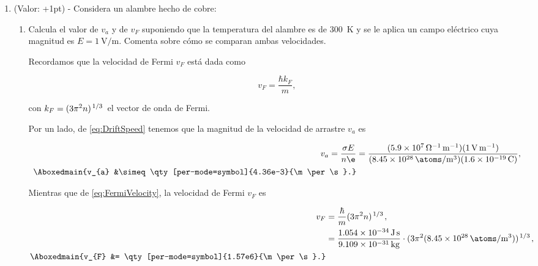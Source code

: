 \documentclass[./../main.tex]{subfiles}
\begin{document}
\begin{exercise}
\begin{enumerate}
            \color{blue}
            \item (Valor: +1pt) - Considera un alambre hecho de cobre:
                \begin{enumerate}[label = (b.\arabic*)]
                    \item Calcula el valor de \(v_{a}\) y de \(v_{F}\) suponiendo que la temperatura del alambre es de \qty{300}{\kelvin} y se le aplica un campo eléctrico cuya magnitud es \(E = \qty{1}{\V\per\m}\). Comenta sobre cómo se comparan ambas velocidades.
                    
                    \color{black}
                    \begin{solution}
                        Recordamos que la velocidad de Fermi \(v_{F}\) está dada como

                        \begin{equation}
                            v_{F} = \dfrac{\hbar k_{F}}{m},
                            \label{eq:FermiVelocity}
                        \end{equation}

                        con \(k_{F} = (3\pi^{2}n)^{\slashfrac{1}{3}}\) el vector de onda de Fermi.

                        Por un lado, de \cref{eq:DriftSpeed} tenemos que la magnitud de la velocidad de arrastre \(v_{a}\) es

                        \begin{align*}
                            v_{a} = \dfrac{\sigma E}{n\e} &= \dfrac{(\qty[per-mode=power]{5.9e7}{\per\ohm\per\m})(\qty{1}{\V\per\m})}{(\qty[per-mode=symbol]{8.45e28}{\atoms\per\m\cubed})(\qty{1.6e-19}{\C})},\\
                            \Aboxedmain{v_{a} &\simeq \qty[per-mode=symbol]{4.36e-3}{\m\per\s}.}
                        \end{align*}

                        Mientras que de \cref{eq:FermiVelocity}, la velocidad de Fermi \(v_{F}\) es

                        \begin{align}
                            v_{F} &= \dfrac{\hbar}{m}(3\pi^{2}n)^{\slashfrac{1}{3}},\label{eq:FermiVelocityComplete}\\
                            &= \dfrac{\qty{1.054e-34}{\J\s}}{\qty{9.109e-31}{\kg}}\cdot (3\pi^{2}(\qty[per-mode=symbol]{8.45e28}{\atoms\per\m\cubed}))^{\slashfrac{1}{3}},\nonumber\\
                            \Aboxedmain{v_{F} &= \qty[per-mode=symbol]{1.57e6}{\m\per\s}.}\label{eq:FermiVelocityForCopper}
                        \end{align}


\end{solution}
\end{enumerate}
\end{enumerate}
\end{exercise}
\end{document}
